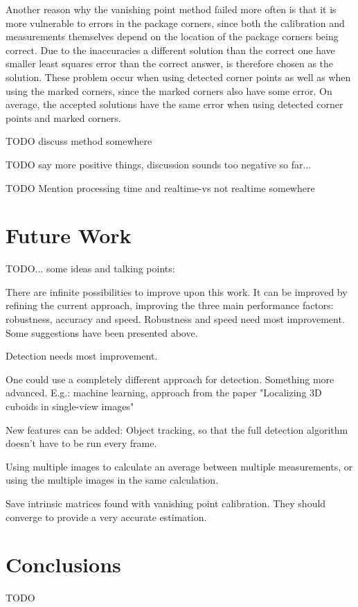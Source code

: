 Another reason why the vanishing point method failed more often is that it is more vulnerable to errors in the package corners, since both the calibration and measurements themselves depend on the location of the package corners being correct.
Due to the inaccuracies a different solution than the correct one have smaller least squares error than the correct answer, is therefore chosen as the solution.
These problem occur when using detected corner points as well as when using the marked corners, since the marked corners also have some error.
On average, the accepted solutions have the same error when using detected corner points and marked corners. %

TODO discuss method somewhere %

TODO say more positive things, discussion sounds too negative so far... %

TODO Mention processing time and realtime-vs not realtime somewhere  %

\section{Future Work} \label{discussion:future_work}
TODO... some ideas and talking points: %

There are infinite possibilities to improve upon this work.
It can be improved by refining the current approach, improving the three main performance factors: robustness, accuracy and speed.
Robustness and speed need most improvement.
Some suggestions have been presented above.

Detection needs most improvement. 

One could use a completely different approach for detection. Something more advanced. E.g.: machine learning, approach from the paper "Localizing 3D cuboids in single-view images"\cite{xiaolocalizing}

New features can be added: Object tracking, so that the full detection algorithm doesn't have to be run every frame.

Using multiple images to calculate an average between multiple measurements, or using the multiple images in the same calculation.

Save intrinsic matrices found with vanishing point calibration. 
They should converge to provide a very accurate estimation.

\section{Conclusions}
TODO










